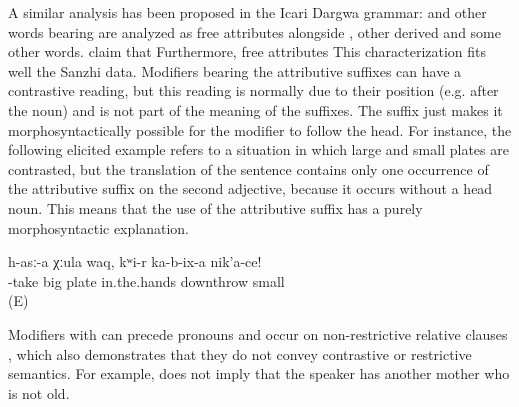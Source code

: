 A similar analysis has been proposed in the Icari Dargwa grammar:  and other words bearing  are analyzed as free attributes alongside , other derived  and some other words. \citet[48, 129]{Sumbatova.Mutalov2003} claim that  Furthermore, free attributes  This characterization fits well the Sanzhi data. Modifiers bearing the attributive suffixes can have a contrastive reading, but this reading is normally due to their position (e.g. after the noun) and is not part of the meaning of the suffixes. The suffix just makes it morphosyntactically possible for the modifier to follow the head. For instance, the following elicited example refers to a situation in which large and small plates are contrasted, but the translation of the sentence contains only one occurrence of the attributive suffix on the second adjective, because it occurs without a head noun. This means that the use of the attributive suffix has a purely morphosyntactic explanation.

\begin{exe}
	\ex	\label{ex:Take the large plate, put away the small one minor}
	\gll	h-asː-a	χːula	waq,	kʷi-r	ka-b-ix-a	nik'a-ce!\\
		-take	big	plate	in.the.hands	downthrow	small\\
	\glt	{} (E)
\end{exe}

Modifiers with  can precede pronouns and occur on non-restrictive relative clauses , which also demonstrates that they do not convey contrastive or restrictive semantics. For example,  does not imply that the speaker has another mother who is not old.


